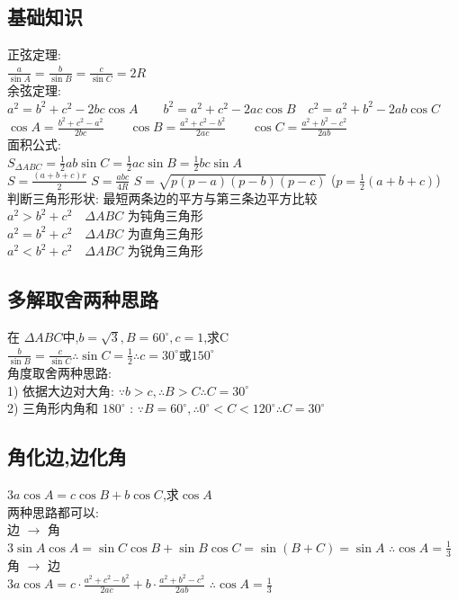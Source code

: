\documentclass[hyperref, UTF8,11pt,a4paper]{ctexart} %
\begin{document}
\subsection{基础知识}
{\color{blue} 正弦定理: } \\ $\frac{a}{\sin A}=\frac{b}{\sin B}=\frac{c}{\sin C}=2 R$ \\
{\color{blue}余弦定理: }\\ $a^{2}=b^{2}+c^{2}-2 b c \cos A \qquad b^{2}=a^{2}+c^{2}-2 a c \cos B \quad c^{2}=a^{2}+b^{2}-2 a b \cos C$ \\
\qquad \qquad $\cos A=\frac{b^{2}+c^{2}-a^{2}}{2 b c} \qquad \cos B=\frac{a^{2}+c^{2}-b^{2}}{2 a c} \qquad \cos C=\frac{a^{2}+b^{2}-c^{2}}{2 a b}$ \\
{\color{blue}面积公式:} \\
$S_{\Delta A B C}=\frac{1}{2} a b \sin C=\frac{1}{2} a c \sin B=\frac{1}{2} b c \sin A$ \\
$S=\frac{(a+b+c) r}{2}$ \qquad
$S=\frac{abc}{4R}$ \qquad $S=\sqrt{p(p-a)(p-b)(p-c)}$ \qquad ($p=\frac{1}{2}(a+b+c)$) \\
{\color{blue}判断三角形形状:}
最短两条边的平方与第三条边平方比较 \\
$a^{2}>b^{2}+c^{2} \quad \Delta A B C$ 为钝角三角形 \\
$a^{2}=b^{2}+c^{2} \quad \Delta A B C$ 为直角三角形 \\
$a^{2}<b^{2}+c^{2} \quad \Delta A B C$ 为锐角三角形 \\
\subsection{多解取舍两种思路}
{\color{red} 在 $\Delta A B C$中,$b=\sqrt{3}, B=60^{\circ}, c=1$,求C } \\
$ \frac{b}{\sin B}=\frac{c}{\sin C} \therefore \sin C=\frac{1}{2} \therefore c=30^{\circ}$或$150^{\circ}$ \\
{\color{blue} 角度取舍两种思路: }\\
1) 依据大边对大角:  \quad
$\because b>c,  \therefore B>C \therefore C=30^{\circ}$ \\
2) 三角形内角和 $180^{\circ}$ : \quad
$ \because   B=60^{\circ}, \therefore 0^{\circ}<C<120^{\circ}  \therefore C=30^{\circ}$ \\


\subsection{角化边,边化角}
{\color{red} $3a\cos A=c\cos B+b\cos C$,求$\cos A $} \\
两种思路都可以: \\
边 $\rightarrow$ 角 \\
$3 \sin A \cos A=\sin C \cos B+\sin B \cos C =\sin (B+C) =\sin A$
$\therefore   \cos A=\frac{1}{3}$ \\
角 $\rightarrow$ 边	 \\
$3 a \cos A=c \cdot \frac{a^{2}+c^{2}-b^{2}}{2 a c}+b \cdot \frac{a^{2}+b^{2}-c^{2}}{2 a b}$
$\therefore  \cos A=\frac{1}{3}$ \\
\end{document}
